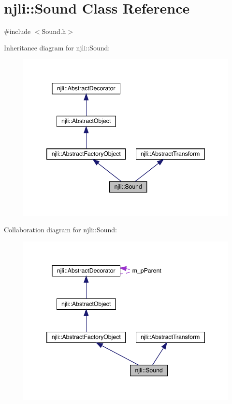 \hypertarget{classnjli_1_1_sound}{}\section{njli\+:\+:Sound Class Reference}
\label{classnjli_1_1_sound}


{\ttfamily \#include $<$Sound.\+h$>$}



Inheritance diagram for njli\+:\+:Sound\+:\nopagebreak
\begin{figure}[H]
\begin{center}
\leavevmode
\includegraphics[width=346pt]{classnjli_1_1_sound__inherit__graph}
\end{center}
\end{figure}


Collaboration diagram for njli\+:\+:Sound\+:\nopagebreak
\begin{figure}[H]
\begin{center}
\leavevmode
\includegraphics[width=346pt]{classnjli_1_1_sound__coll__graph}
\end{center}
\end{figure}
